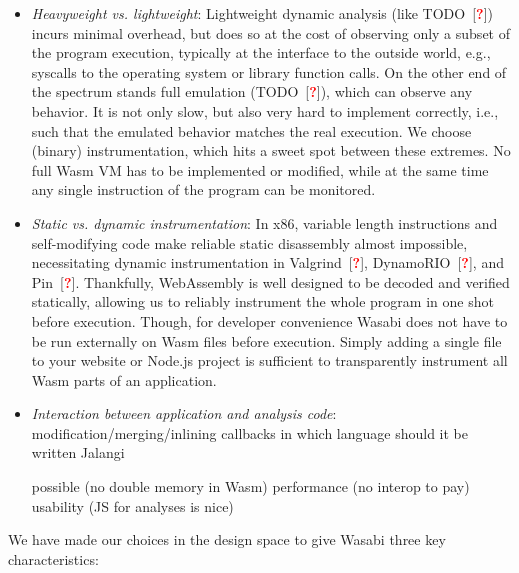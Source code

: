 \documentclass[sigplan,review,anonymous]{acmart}\settopmatter{printfolios=true,printccs=false,printacmref=false}
\newcommand{\citeTodo}{[\textcolor{red}{\bfseries?}]}
\begin{document}
\begin{itemize}[leftmargin=\parindent, label=$\circ$]
	\item \emph{Heavyweight vs. lightweight}: Lightweight dynamic analysis (like TODO~\citeTodo) incurs minimal overhead, but does so at the cost of observing only a subset of the program execution, typically at the interface to the outside world, e.g., syscalls to the operating system or library function calls. On the other end of the spectrum stands full emulation (TODO~\citeTodo), which can observe any behavior. It is not only slow, but also very hard to implement correctly, i.e., such that the emulated behavior matches the real execution. We choose (binary) instrumentation, which hits a sweet spot between these extremes. No full Wasm VM has to be implemented or modified, while at the same time any single instruction of the program can be monitored.
	
	\item \emph{Static vs. dynamic instrumentation}: In x86, variable length instructions and self-modifying code make reliable static disassembly almost impossible, necessitating dynamic instrumentation in Valgrind~\citeTodo, DynamoRIO~\citeTodo, and Pin~\citeTodo. Thankfully, WebAssembly is well designed to be decoded and verified statically, allowing us to reliably instrument the whole program in one shot before execution. Though, for developer convenience Wasabi does not have to be run externally on Wasm files before execution. Simply adding a single file to your website or Node.js project is sufficient to transparently instrument all Wasm parts of an application.
	
	\item \emph{Interaction between application and analysis code}:
	modification/merging/inlining
	callbacks
	in which language should it be written	
	Jalangi~\cite{Sen:2013:JSR:2491411.2491447}
	
	possible (no double memory in Wasm)
	performance (no interop to pay)
	usability (JS for analyses is nice)
\end{itemize}

\noindent
We have made our choices in the design space to give Wasabi three key characteristics:
\end{document}
